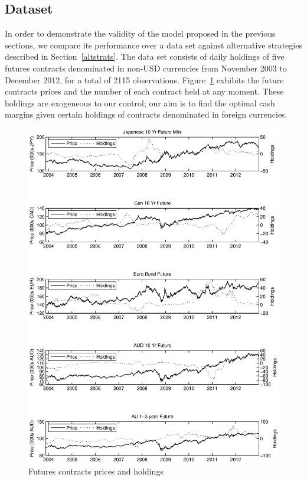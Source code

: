 \subsection{Dataset}
\label{dataset} In order to demonstrate the validity of the model
proposed in the previous sections, we compare its performance over a
data set against alternative strategies described in
Section~\ref{altstrats}. The data set consists of daily holdings of
five futures contracts denominated in non-USD currencies from
November 2003 to December 2012, for a total of 2115 observations.
Figure~\ref{prices} exhibits the future contracts prices and the
number of each contract held at any moment. These holdings are
exogeneous to our control; our aim is to find the optimal cash
margins given certain holdings of contracts denominated in foreign
currencies.
\begin{figure}[htbp]
    \centerline{\includegraphics[scale=0.8]{contractsprices.eps}}
    \caption{Futures contracts prices and holdings}
\label{prices}
\end{figure}

